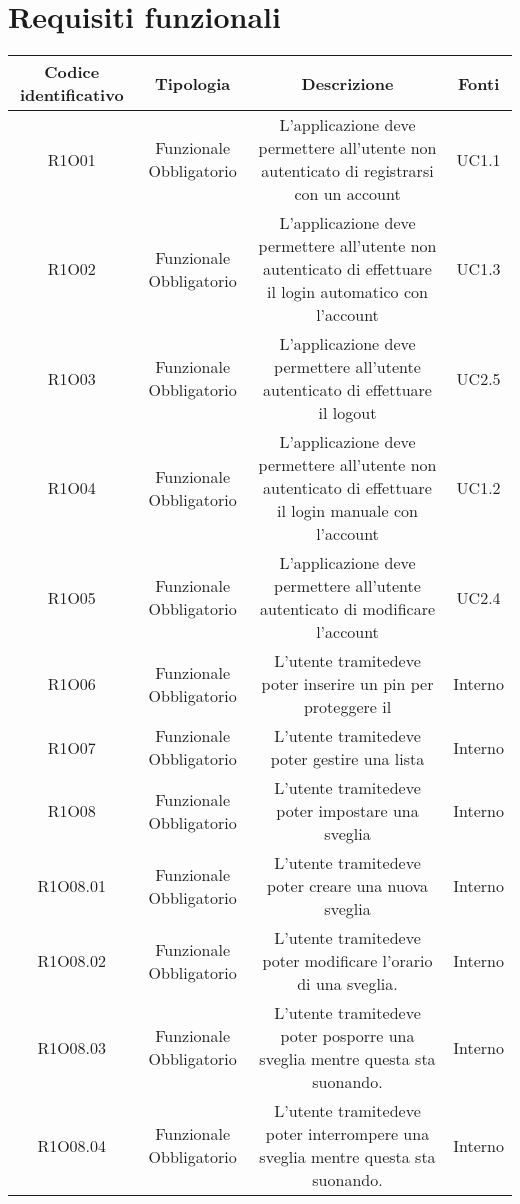 \section{Requisiti funzionali}
\begin{tabularx}{\textwidth}{|C|C|C|C|}
	\hline
     \textbf{Codice identificativo} & \textbf{Tipologia} & \textbf{Descrizione} & \textbf{Fonti} \\
    \hline
	\endhead
	R1O01& Funzionale Obbligatorio &L'applicazione deve permettere all'utente non autenticato di registrarsi con un account& UC1.1	\\
	\hline
	R1O02& Funzionale Obbligatorio &L'applicazione deve permettere all'utente non autenticato di effettuare il login automatico con l'account & UC1.3\\
	\hline
	R1O03& Funzionale Obbligatorio &L'applicazione deve permettere all'utente autenticato di  effettuare il logout & UC2.5\\
	\hline
	R1O04& Funzionale Obbligatorio &L'applicazione deve permettere all'utente non autenticato di effettuare il login manuale con l'account& UC1.2\\
	\hline
	R1O05& Funzionale Obbligatorio&L'applicazione deve permettere all'utente autenticato di modificare l'account& UC2.4\\
	\hline
	R1O06& Funzionale Obbligatorio&L'utente tramitedeve poter inserire un pin per proteggere il & Interno \\
	\hline
	R1O07&Funzionale Obbligatorio & L'utente tramitedeve poter gestire una lista& Interno\\
	\hline
	R1O08&Funzionale Obbligatorio &L'utente tramitedeve poter impostare una sveglia &Interno\\
	\hline
	R1O08.01 & Funzionale Obbligatorio & L'utente tramitedeve poter creare una nuova sveglia &Interno\\
	\hline
	R1O08.02 & Funzionale Obbligatorio & L'utente tramitedeve poter modificare l'orario di una sveglia. &Interno\\
	\hline
	R1O08.03 & Funzionale Obbligatorio & L'utente tramitedeve poter posporre una sveglia mentre questa sta suonando. &Interno\\
	\hline	
	R1O08.04 & Funzionale Obbligatorio & L'utente tramitedeve poter interrompere una sveglia mentre questa sta suonando. &Interno\\

\end{tabularx}
